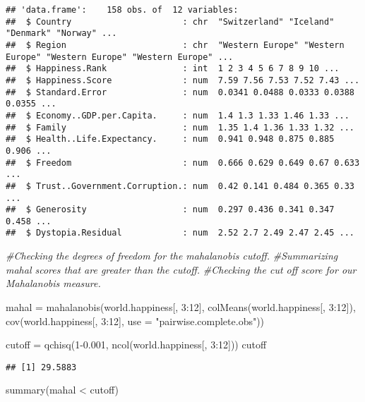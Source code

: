 \documentclass[
]{article}
\newenvironment{Shaded}{\begin{snugshade}}{\end{snugshade}}
\newcommand{\AttributeTok}[1]{\textcolor[rgb]{0.77,0.63,0.00}{#1}}
\newcommand{\CommentTok}[1]{\textcolor[rgb]{0.56,0.35,0.01}{\textit{#1}}}
\newcommand{\DecValTok}[1]{\textcolor[rgb]{0.00,0.00,0.81}{#1}}
\newcommand{\FloatTok}[1]{\textcolor[rgb]{0.00,0.00,0.81}{#1}}
\newcommand{\FunctionTok}[1]{\textcolor[rgb]{0.00,0.00,0.00}{#1}}
\newcommand{\NormalTok}[1]{#1}
\newcommand{\OtherTok}[1]{\textcolor[rgb]{0.56,0.35,0.01}{#1}}
\newcommand{\SpecialCharTok}[1]{\textcolor[rgb]{0.00,0.00,0.00}{#1}}
\newcommand{\StringTok}[1]{\textcolor[rgb]{0.31,0.60,0.02}{#1}}
\begin{document}
\begin{verbatim}
## 'data.frame':    158 obs. of  12 variables:
##  $ Country                      : chr  "Switzerland" "Iceland" "Denmark" "Norway" ...
##  $ Region                       : chr  "Western Europe" "Western Europe" "Western Europe" "Western Europe" ...
##  $ Happiness.Rank               : int  1 2 3 4 5 6 7 8 9 10 ...
##  $ Happiness.Score              : num  7.59 7.56 7.53 7.52 7.43 ...
##  $ Standard.Error               : num  0.0341 0.0488 0.0333 0.0388 0.0355 ...
##  $ Economy..GDP.per.Capita.     : num  1.4 1.3 1.33 1.46 1.33 ...
##  $ Family                       : num  1.35 1.4 1.36 1.33 1.32 ...
##  $ Health..Life.Expectancy.     : num  0.941 0.948 0.875 0.885 0.906 ...
##  $ Freedom                      : num  0.666 0.629 0.649 0.67 0.633 ...
##  $ Trust..Government.Corruption.: num  0.42 0.141 0.484 0.365 0.33 ...
##  $ Generosity                   : num  0.297 0.436 0.341 0.347 0.458 ...
##  $ Dystopia.Residual            : num  2.52 2.7 2.49 2.47 2.45 ...
\end{verbatim}

\begin{Shaded}
\begin{Highlighting}[]
\CommentTok{\#Checking the degrees of freedom for the mahalanobis cutoff. }
\CommentTok{\#Summarizing mahal scores that are greater than the cutoff. }
\CommentTok{\#Checking the cut off score for our Mahalanobis measure.}

\NormalTok{mahal }\OtherTok{=} \FunctionTok{mahalanobis}\NormalTok{(world.happiness[, }\DecValTok{3}\SpecialCharTok{:}\DecValTok{12}\NormalTok{], }\FunctionTok{colMeans}\NormalTok{(world.happiness[, }\DecValTok{3}\SpecialCharTok{:}\DecValTok{12}\NormalTok{]), }\FunctionTok{cov}\NormalTok{(world.happiness[, }\DecValTok{3}\SpecialCharTok{:}\DecValTok{12}\NormalTok{], }\AttributeTok{use =} \StringTok{"pairwise.complete.obs"}\NormalTok{))}

\NormalTok{cutoff }\OtherTok{=} \FunctionTok{qchisq}\NormalTok{(}\DecValTok{1}\FloatTok{{-}0.001}\NormalTok{, }\FunctionTok{ncol}\NormalTok{(world.happiness[, }\DecValTok{3}\SpecialCharTok{:}\DecValTok{12}\NormalTok{]))}
\NormalTok{cutoff}
\end{Highlighting}
\end{Shaded}

\begin{verbatim}
## [1] 29.5883
\end{verbatim}

\begin{Shaded}
\begin{Highlighting}[]
\FunctionTok{summary}\NormalTok{(mahal }\SpecialCharTok{\textless{}}\NormalTok{ cutoff)}
\end{Highlighting}
\end{Shaded}
\end{document}
